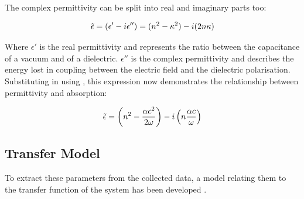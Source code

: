 The complex permittivity can be split into real and imaginary parts too:

\begin{equation}
\Tilde{\epsilon} = (\epsilon' - i\epsilon'') = (n^2 - \kappa^2) - i(2n\kappa)
\end{equation}

Where \(\epsilon'\) is the real permittivity and represents the ratio between the capacitance of a vacuum and of a dielectric. \(\epsilon''\) is the complex permittivity and describes the energy lost in coupling between the electric field and the dielectric polarisation. Substituting in using , this expression now demonstrates the relationship between permittivity and absorption:

\begin{equation}
\Tilde{\epsilon} = \left(n^2 - \frac{\alpha c^2}{2\omega}\right) - i\left(n\frac{\alpha c}{\omega}\right)
\end{equation}

\subsection{Transfer Model}
To extract these parameters from the collected data, a model relating them to the transfer function of the system has been developed \cite{Duvillaret1996}. 

